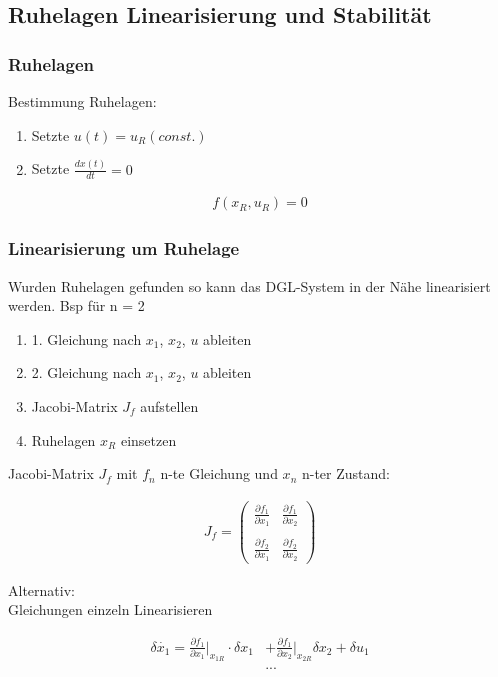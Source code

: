 \documentclass[10pt,a4paper]{article}
\begin{document}
\subsection{Ruhelagen Linearisierung und Stabilität}

\subsubsection{Ruhelagen}
Bestimmung Ruhelagen:
\begin{enumerate}
    \item Setzte $u(t) = u_R (const.)$
    \item Setzte $\frac{dx(t)}{dt} = 0$
\end{enumerate}

  \begin{mdframed}[style=exercise]
    \begin{align}
        f(x_R, u_R) = 0
    \end{align}
  \end{mdframed}

\subsubsection{Linearisierung um Ruhelage}
Wurden Ruhelagen gefunden so kann das DGL-System in der
Nähe linearisiert werden.
Bsp für n = 2
\begin{enumerate}
    \item 1. Gleichung nach $x_1$, $x_2$, $u$ ableiten
    \item 2. Gleichung nach $x_1$, $x_2$, $u$ ableiten
    \item Jacobi-Matrix $J_f$ aufstellen 
    \item Ruhelagen $x_R$ einsetzen
\end{enumerate}
Jacobi-Matrix $J_f$ mit $f_n$ n-te Gleichung und $x_n$ n-ter Zustand:
  \begin{mdframed}[style=exercise]
    \begin{align}
        J_f = 
        \begin{pmatrix}
            \frac{\partial f_1}{\partial x_1} & \frac{\partial f_1}{\partial x_2} \\ \\
            \frac{\partial f_2}{\partial x_1} & \frac{\partial f_2}{\partial x_2} 
        \end{pmatrix} 
    \end{align}
  \end{mdframed}
Alternativ: \\
Gleichungen einzeln Linearisieren
  \begin{mdframed}[style=exercise]
    \begin{align}
        \delta \dot{x_1} = \frac{\partial f_1}{\partial x_1} \big|_{x_{1R}} \cdot \delta x_1
        &+ \frac{\partial f_1}{\partial x_2} \big|_{x_{2R}} \delta x_2+ \delta u_1 \\
        &...
    \end{align}
  \end{mdframed}
\end{document}
